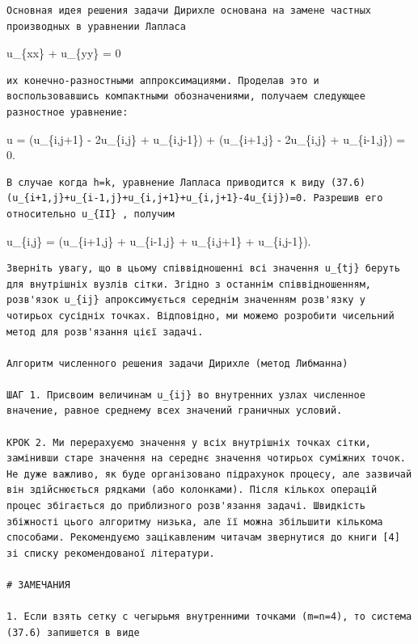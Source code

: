 \documentclass[
  ukrainian,
]{article}
\begin{document}
\begin{verbatim}
Основная идея решения задачи Дирихле основана на замене частных производных в уравнении Лапласа
\end{verbatim}

u\_\{xx\} + u\_\{yy\} = 0

\begin{verbatim}
их конечно-разностными аппроксимациями. Проделав это и воспользовавшись компактными обозначениями, получаем следующее разностное уравнение:
\end{verbatim}

\Delta u =  (u\_\{i,j+1\} - 2u\_\{i,j\} + u\_\{i,j-1\}) +
 (u\_\{i+1,j\} - 2u\_\{i,j\} + u\_\{i-1,j\}) = 0.

\begin{verbatim}
В случае когда h=k, уравнение Лапласа приводится к виду (37.6) (u_{i+1,j}+u_{i-1,j}+u_{i,j+1}+u_{i,j+1}-4u_{ij})=0. Разрешив его относительно u_{II} , получим
\end{verbatim}

u\_\{i,j\} =  (u\_\{i+1,j\} + u\_\{i-1,j\} + u\_\{i,j+1\} +
u\_\{i,j-1\}).

\begin{verbatim}
Зверніть увагу, що в цьому співвідношенні всі значення u_{tj} беруть для внутрішніх вузлів сітки. Згідно з останнім співвідношенням, розв'язок u_{ij} апроксимується середнім значенням розв'язку у чотирьох сусідніх точках. Відповідно, ми можемо розробити чисельний метод для розв'язання цієї задачі.

Алгоритм численного решения задачи Дирихле (метод Либманна)

ШАГ 1. Присвоим величинам u_{ij} во внутренних узлах численное вначение, равное среднему всех значений граничных условий.

КРОК 2. Ми перерахуємо значення у всіх внутрішніх точках сітки, замінивши старе значення на середнє значення чотирьох суміжних точок. Не дуже важливо, як буде організовано підрахунок процесу, але зазвичай він здійснюється рядками (або колонками). Після кількох операцій процес збігається до приблизного розв'язання задачі. Швидкість збіжності цього алгоритму низька, але її можна збільшити кількома способами. Рекомендуємо зацікавленим читачам звернутися до книги [4] зі списку рекомендованої літератури.

# ЗАМЕЧАНИЯ

1. Если взять сетку с чегырьмя внутренними точками (m=n=4), то система (37.6) запишется в виде
\end{verbatim}
\end{document}
